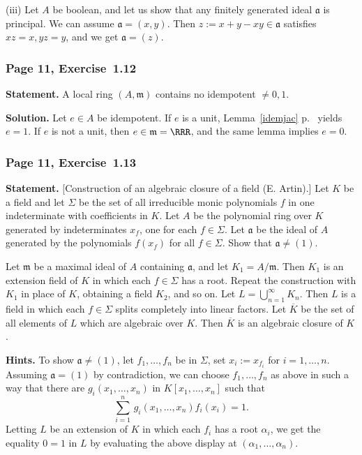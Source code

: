 \documentclass[12pt,letterpaper]{article}%
\newcommand{\mf}{\mathfrak}
\newcommand{\aaa}{\mf a}
\newcommand{\mmm}{\mf m}
\newcommand{\ov}{\overline}
\newcommand{\nn}{\noindent}
\begin{document}
\nn(iii) Let $A$ be boolean, and let us show that any finitely generated ideal $\aaa$ is principal. We can assume $\aaa=(x,y)$. Then $z:=x+y-xy\in\aaa$ satisfies $xz=x,yz=y$, and we get $\aaa=(z)$.

\subsubsection{Page 11, Exercise~1.12}\label{ex1.12}%

\textbf{Statement.} A local ring $(A,\mmm)$ contains no idempotent $\neq0,1$. 

\nn\textbf{Solution.} Let $e\in A$ be idempotent. If $e$ is a unit, Lemma~\ref{idemjac} p.~\pageref{idemjac} yields $e=1$. If $e$ is not a unit, then $e\in\mmm=\RRR$, and the same lemma implies $e=0$.%

\subsubsection{Page 11, Exercise~1.13}%

\textbf{Statement.} [Construction of an algebraic closure of a field (E. Artin).] Let $K$ be a field and let $\Sigma$ be the set of all irreducible monic polynomials $f$ in one indeterminate with coefficients in $K$. Let $A$ be the polynomial ring over $K$ generated by indeterminates $x_f$, one for each $f\in\Sigma$. Let $\aaa$ be the ideal of $A$ generated by the polynomials $f(x_f)$ for all $f\in\Sigma$. Show that $\aaa\ne(1)$.

Let $\mmm$ be a maximal ideal of $A$ containing $\aaa$, and let $K_1=A/\mmm$. Then $K_1$ is an extension field of $K$ in which each $f\in\Sigma$ has a root. Repeat the construction with $K_1$ in place of $K$, obtaining a field $K_2$, and so on. Let $L=\bigcup_{n=1}^\infty K_n$. Then $L$ is a field in which each $f\in\Sigma$ splits completely into linear factors. Let $\ov K$ be the set of all elements of $L$ which are algebraic over $K$. Then $\ov K$ is an algebraic closure of $K$.

\nn\textbf{Hints.} To show $\aaa\neq(1)$, let $f_1,\dots,f_n$ be in $\Sigma$, set $x_i:=x_{f_i}$ for $i=1,\dots,n$. Assuming $\aaa=(1)$ by contradiction, we can choose $f_1,\dots,f_n$ as above in such a way that there are $g_i(x_1,\dots,x_n)$ in $K[x_1,\dots,x_n]$ such that 
$$
\sum_{i=1}^n\,g_i(x_1,\dots,x_n)f_i(x_i)=1.
$$ 
Letting $L$ be an extension of $K$ in which each $f_i$ has a root $\alpha_i$, we get the equality $0=1$ in $L$ by evaluating the above display at $(\alpha_1,\dots,\alpha_n)$.
\end{document}
